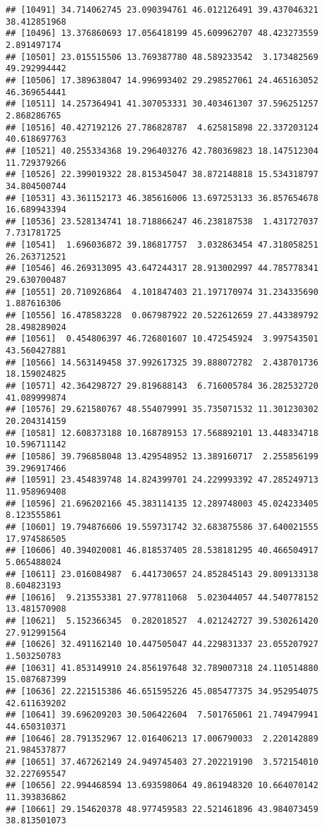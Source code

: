 \documentclass[
]{article}
\begin{document}
\begin{verbatim}
## [10491] 34.714062745 23.090394761 46.012126491 39.437046321 38.412851968
## [10496] 13.376860693 17.056418199 45.609962707 48.423273559  2.891497174
## [10501] 23.015515506 13.769387780 48.589233542  3.173482569 49.292994442
## [10506] 17.389638047 14.996993402 29.298527061 24.465163052 46.369654441
## [10511] 14.257364941 41.307053331 30.403461307 37.596251257  2.868286765
## [10516] 40.427192126 27.786828787  4.625815898 22.337203124 40.618697763
## [10521] 40.255334368 19.296403276 42.780369823 18.147512304 11.729379266
## [10526] 22.399019322 28.815345047 38.872148818 15.534318797 34.804500744
## [10531] 43.361152173 46.385616006 13.697253133 36.857654678 16.689943394
## [10536] 23.528134741 18.718866247 46.238187538  1.431727037  7.731781725
## [10541]  1.696036872 39.186817757  3.032863454 47.318058251 26.263712521
## [10546] 46.269313095 43.647244317 28.913002997 44.785778341 29.630700487
## [10551] 20.710926864  4.101847403 21.197170974 31.234335690  1.887616306
## [10556] 16.478583228  0.067987922 20.522612659 27.443389792 28.498289024
## [10561]  0.454806397 46.726801607 10.472545924  3.997543501 43.560427881
## [10566] 14.563149458 37.992617325 39.888072782  2.438701736 18.159024825
## [10571] 42.364298727 29.819688143  6.716005784 36.282532720 41.089999874
## [10576] 29.621580767 48.554079991 35.735071532 11.301230302 20.204314159
## [10581] 12.608373188 10.168789153 17.568892101 13.448334718 10.596711142
## [10586] 39.796858048 13.429548952 13.389160717  2.255856199 39.296917466
## [10591] 23.454839748 14.824399701 24.229993392 47.285249713 11.958969408
## [10596] 21.696202166 45.383114135 12.289748003 45.024233405  8.123555861
## [10601] 19.794876606 19.559731742 32.683875586 37.640021555 17.974586505
## [10606] 40.394020081 46.818537405 28.538181295 40.466504917  5.065488024
## [10611] 23.016084987  6.441730657 24.852845143 29.809133138  8.604823193
## [10616]  9.213553381 27.977811068  5.023044057 44.540778152 13.481570908
## [10621]  5.152366345  0.282018527  4.021242727 39.530261420 27.912991564
## [10626] 32.491162140 10.447505047 44.229831337 23.055207927  1.503250783
## [10631] 41.853149910 24.856197648 32.789007318 24.110514880 15.087687399
## [10636] 22.221515386 46.651595226 45.085477375 34.952954075 42.611639202
## [10641] 39.696209203 30.506422604  7.501765061 21.749479941 44.650310371
## [10646] 28.791352967 12.016406213 17.006790033  2.220142889 21.984537877
## [10651] 37.467262149 24.949745403 27.202219190  3.572154010 32.227695547
## [10656] 22.994468594 13.693598064 49.861948320 10.664070142 11.393836862
## [10661] 29.154620378 48.977459583 22.521461896 43.984073459 38.813501073

\end{verbatim}
\end{document}
